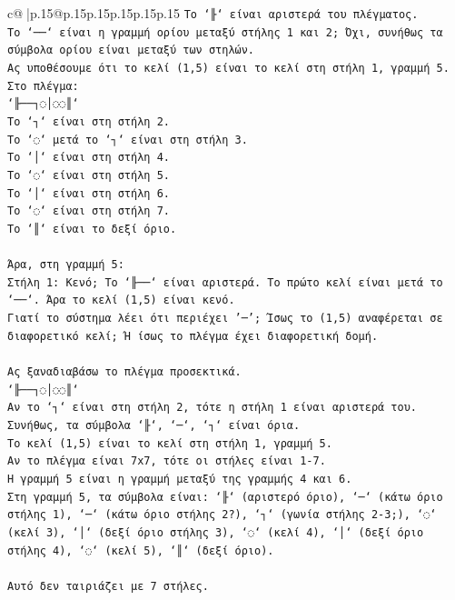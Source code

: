 \documentclass{article}
\begin{document}
{\begin{supertabular}{c@{$\;$}|p{.15\linewidth}@{}p{.15\linewidth}p{.15\linewidth}p{.15\linewidth}p{.15\linewidth}p{.15\linewidth}}
{{{\texttt{Το `╟` είναι αριστερά του πλέγματος.} \\
\texttt{Το `──` είναι η γραμμή ορίου μεταξύ στήλης 1 και 2; Όχι, συνήθως τα σύμβολα ορίου είναι μεταξύ των στηλών.} \\
\texttt{Ας υποθέσουμε ότι το κελί (1,5) είναι το κελί στη στήλη 1, γραμμή 5.} \\
\texttt{Στο πλέγμα:} \\
\texttt{`╟──┐◌│◌◌║`} \\
\texttt{Το `┐` είναι στη στήλη 2.} \\
\texttt{Το `◌` μετά το `┐` είναι στη στήλη 3.} \\
\texttt{Το `│` είναι στη στήλη 4.} \\
\texttt{Το `◌` είναι στη στήλη 5.} \\
\texttt{Το `│` είναι στη στήλη 6.} \\
\texttt{Το `◌` είναι στη στήλη 7.} \\
\texttt{Το `║` είναι το δεξί όριο.} \\
\\ 
\texttt{Άρα, στη γραμμή 5:} \\
\texttt{Στήλη 1: Κενό; Το `╟──` είναι αριστερά. Το πρώτο κελί είναι μετά το `──`. Άρα το κελί (1,5) είναι κενό.} \\
\texttt{Γιατί το σύστημα λέει ότι περιέχει '─'; Ίσως το (1,5) αναφέρεται σε διαφορετικό κελί; Ή ίσως το πλέγμα έχει διαφορετική δομή.} \\
\\ 
\texttt{Ας ξαναδιαβάσω το πλέγμα προσεκτικά.} \\
\texttt{`╟──┐◌│◌◌║`} \\
\texttt{Αν το `┐` είναι στη στήλη 2, τότε η στήλη 1 είναι αριστερά του.} \\
\texttt{Συνήθως, τα σύμβολα `╟`, `─`, `┐` είναι όρια.} \\
\texttt{Το κελί (1,5) είναι το κελί στη στήλη 1, γραμμή 5.} \\
\texttt{Αν το πλέγμα είναι 7x7, τότε οι στήλες είναι 1{-}7.} \\
\texttt{Η γραμμή 5 είναι η γραμμή μεταξύ της γραμμής 4 και 6.} \\
\texttt{Στη γραμμή 5, τα σύμβολα είναι: `╟` (αριστερό όριο), `─` (κάτω όριο στήλης 1), `─` (κάτω όριο στήλης 2?), `┐` (γωνία στήλης 2{-}3;), `◌` (κελί 3), `│` (δεξί όριο στήλης 3), `◌` (κελί 4), `│` (δεξί όριο στήλης 4), `◌` (κελί 5), `║` (δεξί όριο).} \\
\\ 
\texttt{Αυτό δεν ταιριάζει με 7 στήλες.} \\
}}}
\end{supertabular}}
\end{document}
